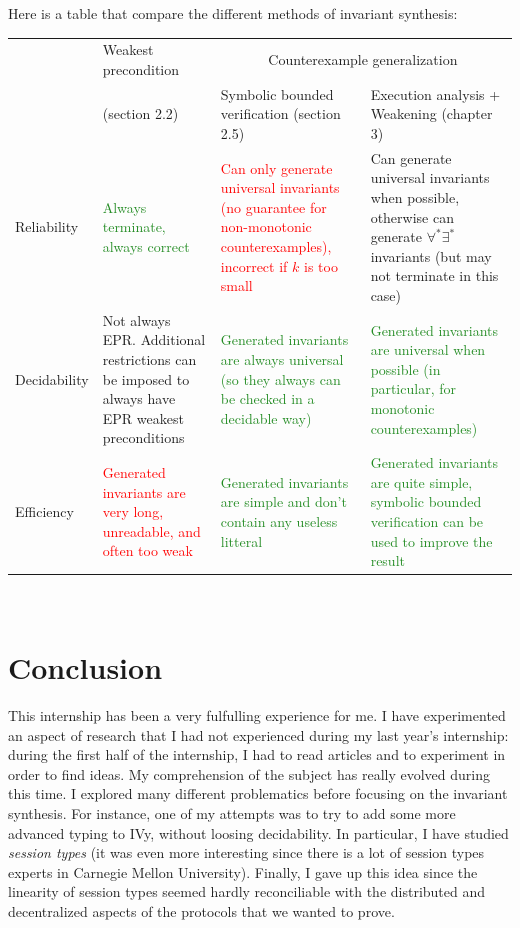 \documentclass[11pt,a4paper,oldfontcommands,openany]{memoir}
\begin{document}
    Here is a table that compare the different methods of invariant synthesis:\\
    \begin{tabularx}{\textwidth}{|l|X|X|X|}
        \hline
            & Weakest precondition & \multicolumn{2}{c|}{Counterexample generalization}\\
        \cline{3-4}
            & (section 2.2) & Symbolic bounded verification (section 2.5) & Execution analysis + Weakening (chapter 3)\\
        \hline
            Reliability & \textcolor{ForestGreen}{Always terminate, always correct} &
            \textcolor{Red}{Can only generate universal invariants (no guarantee for non-monotonic counterexamples), incorrect if \(k\) is too small}
            & \textcolor{Dandelion}{Can generate universal invariants when possible, otherwise can generate \(\forall^*\exists^*\) invariants (but may not terminate in this case)}\\
        \hline
            Decidability & \textcolor{Dandelion}{Not always EPR. Additional restrictions can be imposed to always have EPR weakest preconditions}
            & \textcolor{ForestGreen}{Generated invariants are always universal (so they always can be checked in a decidable way)}
            & \textcolor{ForestGreen}{Generated invariants are universal when possible (in particular, for monotonic counterexamples)}\\
        \hline
            Efficiency & \textcolor{Red}{Generated invariants are very long, unreadable, and often too weak}
            & \textcolor{ForestGreen}{Generated invariants are simple and don't contain any useless litteral}
            & \textcolor{ForestGreen}{Generated invariants are quite simple, symbolic bounded verification can be used to improve the result}\\
        \hline
    \end{tabularx}\\

    \section{Conclusion}

    This internship has been a very fulfulling experience for me. I have experimented an aspect of research
    that I had not experienced during my last year's internship:
    during the first half of the internship, I had to read articles and to experiment in order to find ideas.
    My comprehension of the subject has really evolved during this time.
    I explored many different problematics before focusing on the invariant synthesis.
    For instance, one of my attempts was to try to add some more advanced typing to IVy, without loosing decidability.
    In particular, I have studied \textit{session types} (it was even more interesting since there is a lot of session types experts in Carnegie Mellon University).
    Finally, I gave up this idea since the linearity of session types seemed hardly reconciliable with the distributed and decentralized aspects of the protocols
    that we wanted to prove.
\end{document}
